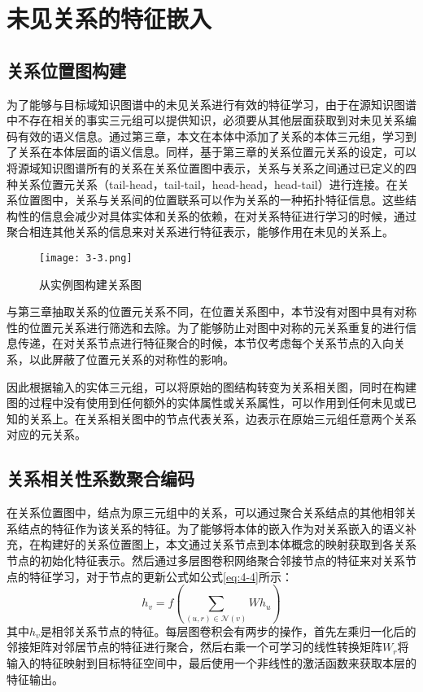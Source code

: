 \section{未见关系的特征嵌入}
\subsection{关系位置图构建}
为了能够与目标域知识图谱中的未见关系进行有效的特征学习，由于在源知识图谱中不存在相关的事实三元组可以提供知识，必须要从其他层面获取到对未见关系编码有效的语义信息。通过第三章，本文在本体中添加了关系的本体三元组，学习到了关系在本体层面的语义信息。同样，基于第三章的关系位置元关系的设定，可以将源域知识图谱所有的关系在关系位置图中表示，关系与关系之间通过已定义的四种关系位置元关系（tail-head，tail-tail，head-head，head-tail）进行连接。在关系位置图中，关系与关系间的位置联系可以作为关系的一种拓扑特征信息。这些结构性的信息会减少对具体实体和关系的依赖，在对关系特征进行学习的时候，通过聚合相连其他关系的信息来对关系进行特征表示，能够作用在未见的关系上。
\begin{figure}[h]
  \centering
  \texttt{[image: 3-3.png]}
  \caption{从实例图构建关系图}
  \label{fig:3-3}
\end{figure}

与第三章抽取关系的位置元关系不同，在位置关系图中，本节没有对图中具有对称性的位置元关系进行筛选和去除。为了能够防止对图中对称的元关系重复的进行信息传递，在对关系节点进行特征聚合的时候，本节仅考虑每个关系节点的入向关系，以此屏蔽了位置元关系的对称性的影响。

因此根据输入的实体三元组，可以将原始的图结构转变为关系相关图，同时在构建图的过程中没有使用到任何额外的实体属性或关系属性，可以作用到任何未见或已知的关系上。在关系相关图中的节点代表关系，边表示在原始三元组任意两个关系对应的元关系。

\subsection{关系相关性系数聚合编码}
在关系位置图中，结点为原三元组中的关系，可以通过聚合关系结点的其他相邻关系结点的特征作为该关系的特征。为了能够将本体的嵌入作为对关系嵌入的语义补充，在构建好的关系位置图上，本文通过关系节点到本体概念的映射获取到各关系节点的初始化特征表示。然后通过多层图卷积网络聚合邻接节点的特征来对关系节点的特征学习，对于节点的更新公式如公式\ref{eq:4-4}所示：
\begin{equation}
  h_{v} = f\left( \sum_{(u,r) \in \mathcal{N}(v)} W h_{u}\right) \label{eq:4-4}
\end{equation}
其中\(h_{v}\)是相邻关系节点的特征。每层图卷积会有两步的操作，首先左乘归一化后的邻接矩阵对邻居节点的特征进行聚合，然后右乘一个可学习的线性转换矩阵\(W_{r}\)将输入的特征映射到目标特征空间中，最后使用一个非线性的激活函数来获取本层的特征输出。

